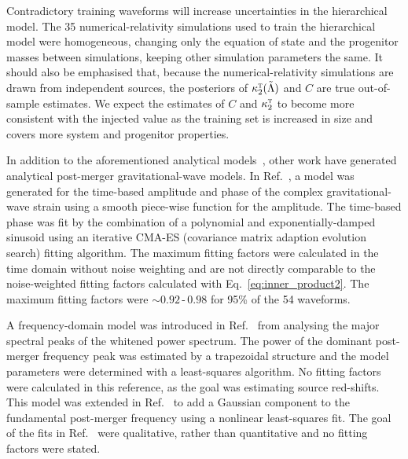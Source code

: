\documentclass[../Thesis.tex]{subfiles}
\begin{document}
    Contradictory training waveforms will increase uncertainties in the hierarchical model.
    The 35 numerical-relativity simulations used to train the hierarchical model were homogeneous, changing only the equation of state and the progenitor masses between simulations, keeping other simulation parameters the same. 
    It should also be emphasised that, because the numerical-relativity simulations are drawn from independent sources, the posteriors of $\kappa_2^\textsc{t} (\tilde{\Lambda})$ and $C$ are true out-of-sample estimates.
    We expect the estimates of $C$ and $\kappa_2^\textsc{t}$ to become more consistent with the injected value as the training set is increased in size and covers more system and progenitor properties. \par
    
    In addition to the aforementioned analytical models~\cite{Bauswein2016,Bose2018}, other work have generated analytical post-merger gravitational-wave  models. 
    In Ref.~\cite{Hotokezaka2013}, a model  was generated for the time-based amplitude and phase of the complex gravitational-wave strain using a smooth piece-wise function for the amplitude. 
    The time-based phase was fit by the combination of a polynomial and exponentially-damped sinusoid using an iterative CMA-ES (covariance matrix adaption evolution search) fitting algorithm.
    The maximum fitting factors were  calculated in the time domain without noise weighting and are not directly comparable to the noise-weighted fitting factors calculated with Eq.~\ref{eq:inner_product2}.
    The maximum fitting factors were  $\sim\!0.92\,$\nobreakdash-$\,0.98$ for 95\% of the 54 waveforms.\par
    
    A frequency-domain model was introduced in Ref.~\cite{Messenger2014} from analysing the major spectral peaks of the whitened power spectrum.
    The power of the dominant post-merger frequency peak was estimated by a trapezoidal structure and the model parameters were determined with a least-squares algorithm. 
    No fitting factors were calculated in this reference, as the goal was estimating source red-shifts.
    This model was extended in Ref.~\cite{Takami2015} to add a Gaussian component to the fundamental post-merger frequency using a nonlinear least-squares fit. 
    The goal of the fits in Ref.~\cite{Takami2015} were qualitative, rather than quantitative and no fitting factors were stated.\par
    
\end{document}
